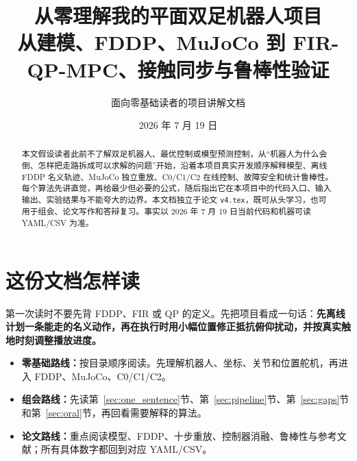 \documentclass[UTF8,11pt,a4paper]{ctexart}
\title{\textbf{从零理解我的平面双足机器人项目}\\[0.4em]
\large 从建模、FDDP、MuJoCo 到 FIR-QP-MPC、接触同步与鲁棒性验证}
\author{面向零基础读者的项目讲解文档}
\date{2026 年 7 月 19 日}
\newcommand{\code}[1]{\texttt{#1}}
\begin{document}
\maketitle

\begin{abstract}
本文假设读者此前不了解双足机器人、最优控制或模型预测控制，从“机器人为什么会倒、怎样把走路拆成可以求解的问题”开始，沿着本项目真实开发顺序解释模型、离线 FDDP 名义轨迹、MuJoCo 独立重放、C0/C1/C2 在线控制、故障安全和统计鲁棒性。每个算法先讲直觉，再给最少但必要的公式，随后指出它在本项目中的代码入口、输入输出、实验结果与不能夸大的边界。本文档独立于论文 \code{v4.tex}，既可从头学习，也可用于组会、论文写作和答辩复习。事实以 2026 年 7 月 19 日当前代码和机器可读 YAML/CSV 为准。
\end{abstract}

\begin{center}
\end{center}

\tableofcontents
\clearpage

\section{这份文档怎样读}\label{sec:reading}

\begin{intuitionbox}
第一次读时不要先背 FDDP、FIR 或 QP 的定义。先把项目看成一句话：\textbf{先离线计划一条能走的名义动作，再在执行时用小幅位置修正抵抗俯仰扰动，并按真实触地时刻调整播放进度。}
\end{intuitionbox}

\begin{itemize}
  \item \textbf{零基础路线：}按目录顺序阅读。先理解机器人、坐标、关节和位置舵机，再进入 FDDP、MuJoCo、C0/C1/C2。
  \item \textbf{组会路线：}先读第~\ref{sec:one_sentence}节、第~\ref{sec:pipeline}节、第~\ref{sec:gaps}节和第~\ref{sec:oral}节，再回看需要解释的算法。
  \item \textbf{论文路线：}重点阅读模型、FDDP、十步重放、控制器消融、鲁棒性与参考文献；所有具体数字都回到对应 YAML/CSV。
\end{itemize}
\end{document}
